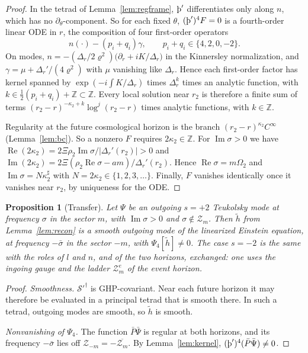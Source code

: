 \documentclass[11pt]{amsart}
\newtheorem{proposition}[theorem]{Proposition}
\theoremstyle{definition}
\theoremstyle{remark}
\numberwithin{equation}{section}
\newcommand{\Th}{\text{\th}}
\newcommand{\Z}{\mathbb{Z}}
\renewcommand{\Im}{\operatorname{Im}}
\renewcommand{\Re}{\operatorname{Re}}
\begin{document}
\begin{proof}
In the tetrad of Lemma~\ref{lem:regframe}, $\Th'$ differentiates only along $n$, which has no
$\partial_\theta$-component. So for each fixed $\theta$, $(\Th')^4F=0$ is a fourth-order linear ODE in $r$, the
composition of four first-order operators
\[
n(\cdot)-(p_i+q_i)\gamma,\qquad p_i+q_i\in\{4,2,0,-2\}.
\]
On modes, $n=-(\Delta_r/2\varrho^2)\big(\partial_r+iK/\Delta_r\big)$ in the Kinnersley normalization, and
$\gamma=\mu+\Delta_r'/(4\varrho^2)$ with $\mu$ vanishing like $\Delta_r$. Hence each first-order
factor has kernel spanned by $\exp(-i\int K/\Delta_r)$ times $\Delta_r^{k}$ times an analytic function, with
$k\in\frac12(p_i+q_i)+\Z\subset\Z$. Every local solution near $r_2$ is therefore a finite sum of terms
$(r_2-r)^{-\kappa_2+k}\log^j(r_2-r)$ times analytic functions, with $k\in\Z$.

Regularity at the future cosmological horizon is the branch $(r_2-r)^{\kappa_2}C^\infty$ (Lemma~\ref{lem:bc}). So a
nonzero $F$ requires $2\kappa_2\in\Z$. For $\Im\sigma>0$ we have
$\Re(2\kappa_2)=2\Xi\rho_2\Im\sigma/|\Delta_r'(r_2)|>0$ and $\Im(2\kappa_2)=2\Xi(\rho_2\Re\sigma-am)/\Delta_r'(r_2)$.
Hence $\Re\sigma=m\Omega_2$ and $\Im\sigma=N\kappa_2^\sharp$ with $N=2\kappa_2\in\{1,2,3,\dots\}$. Finally, $F$ vanishes identically once it vanishes near $r_2$, by uniqueness for the ODE.
\end{proof}

\begin{proposition}[Transfer]\label{prop:transfer}
Let $\Psi$ be an outgoing $s=+2$ Teukolsky mode at frequency $\sigma$ in the sector $m$, with $\Im\sigma>0$ and
$\sigma\notin\mathcal Z_m$. Then $\tilde h$ from Lemma~\ref{lem:recon} is a smooth outgoing mode of the linearized
Einstein equation, at frequency $-\bar\sigma$ in the sector $-m$, with $\Psi_4[\tilde h]\ne0$. The case $s=-2$ is
the same with the roles of $l$ and $n$, and of the two horizons, exchanged: one uses the ingoing gauge and the
ladder $\mathcal Z_m^e$ of the event horizon.
\end{proposition}

\begin{proof}
\emph{Smoothness.} $\mathcal S'^\dagger$ is GHP-covariant. Near each future horizon it may therefore be evaluated in
a principal tetrad that is smooth there. In such a tetrad, outgoing modes are smooth, so $\tilde h$ is smooth.

\emph{Nonvanishing of $\Psi_4$.} The function $\bar P\bar\Psi$ is regular at both horizons, and its frequency
$-\bar\sigma$ lies off $\mathcal Z_{-m}=-\overline{\mathcal Z_m}$. By Lemma~\ref{lem:kernel},
$(\Th')^4(\bar P\bar\Psi)\ne0$.
\end{proof}
\end{document}
